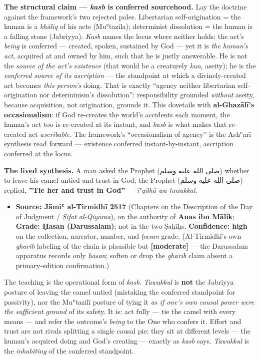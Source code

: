 \documentclass[11pt]{article}
\newcommand{\AR}[1]{{\arabicfont\beginR #1\endR}}
\begin{document}
\textbf{The structural claim — \emph{kasb} is conferred sourcehood.} Lay the doctrine against the framework's two rejected poles. Libertarian self-origination = the human is a \emph{khāliq} of his acts (Muʿtazila); determinist dissolution = the human is a falling stone (Jabriyya). \emph{Kasb} names the locus where neither holds: the act's \emph{being} is conferred — created, spoken, sustained by God — yet it is \emph{the human's act}, acquired at and owned by him, such that he is justly answerable. He is not the \emph{source of the act's existence} (that would be a creaturely \emph{kun}, aseity); he is the \emph{conferred source of its ascription} — the standpoint at which a divinely-created act becomes \emph{this person's} doing. That is exactly ``agency neither libertarian self-origination nor determinism's dissolution'': responsibility grounded \emph{without} aseity, because acquisition, not origination, grounds it. This dovetails with \textbf{al-Ghazālī's occasionalism}: if God re-creates the world's accidents each moment, the human's act too is re-created at its instant, and \emph{kasb} is what makes that re-created act \emph{ascribable}. The framework's ``occasionalism of agency'' is the Ashʿarī synthesis read forward — existence conferred instant-by-instant, ascription conferred at the locus.

\textbf{The lived synthesis.} A man asked the Prophet (\AR{صلى الله عليه وسلم}) whether to leave his camel untied and trust in God; the Prophet (\AR{صلى الله عليه وسلم}) replied, \textbf{''Tie her and trust in God''} — \emph{iʿqilhā wa tawakkal}.

\begin{itemize}
\item \textbf{Source: Jāmiʿ al-Tirmidhī 2517} (Chapters on the Description of the Day of Judgment /\allowbreak{} \emph{Ṣifat al-Qiyāma}), on the authority of \textbf{Anas ibn Mālik}; \textbf{Grade: Ḥasan (Darussalam)}; not in the two Ṣaḥīḥs. \textbf{Confidence: high} on the collection, narrator, number, and \emph{ḥasan} grade. (Al-Tirmidhī's own \emph{gharīb} labeling of the chain is plausible but \textbf{[moderate]} — the Darussalam apparatus records only \emph{ḥasan}; soften or drop the \emph{gharīb} claim absent a primary-edition confirmation.)
\end{itemize}

The teaching is the operational form of \emph{kasb}. \emph{Tawakkul} is \textbf{not} the Jabriyya posture of leaving the camel untied (mistaking the conferred standpoint for passivity), nor the Muʿtazilī posture of tying it \emph{as if one's own causal power were the sufficient ground} of its safety. It is: act fully — tie the camel with every means — and refer the outcome's \emph{being} to the One who confers it. Effort and trust are not rivals splitting a single causal pie; they sit at different levels — the human's acquired doing and God's creating — exactly as \emph{kasb} says. \emph{Tawakkul} is the \emph{inhabiting} of the conferred standpoint.
\end{document}
